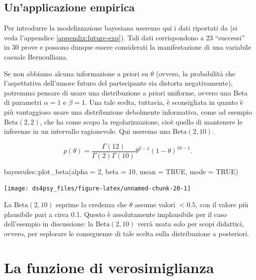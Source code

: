 \documentclass[
  11pt,
]{krantz}
\makeatletter
\newenvironment{Shaded}{\begin{snugshade}}{\end{snugshade}}
\newcommand{\AttributeTok}[1]{\textcolor[rgb]{0.61,0.61,0.61}{#1}}
\newcommand{\ConstantTok}[1]{\textcolor[rgb]{0,0,0}{#1}}
\newcommand{\DecValTok}[1]{\textcolor[rgb]{0.06,0.06,0.06}{#1}}
\newcommand{\FunctionTok}[1]{\textcolor[rgb]{0,0,0}{#1}}
\newcommand{\NormalTok}[1]{#1}
\newcommand{\SpecialCharTok}[1]{\textcolor[rgb]{0,0,0}{#1}}
\newenvironment{kframe}{%
\medskip{}
\setlength{\fboxsep}{.8em}
 \def\at@end@of@kframe{}%
 \ifinner\ifhmode%
  \def\at@end@of@kframe{\end{minipage}}%
  \begin{minipage}{\columnwidth}%
 \fi\fi%
 \def\FrameCommand##1{\hskip\@totalleftmargin \hskip-\fboxsep
 \colorbox{shadecolor}{##1}\hskip-\fboxsep
     \hskip-\linewidth \hskip-\@totalleftmargin \hskip\columnwidth}%
 \MakeFramed {\advance\hsize-\width
   \@totalleftmargin\z@ \linewidth\hsize
   \@setminipage}}%
 {\par\unskip\endMakeFramed%
 \at@end@of@kframe}
\renewenvironment{Shaded}{\begin{kframe}}{\end{kframe}}
\theoremstyle{definition}
\theoremstyle{definition}
\theoremstyle{definition}
\theoremstyle{definition}
\theoremstyle{remark}
\makeatother
\begin{document}
\hypertarget{unapplicazione-empirica}{%
\subsection{Un'applicazione empirica}\label{unapplicazione-empirica}}

Per introdurre la modelizzazione bayesiana useremo qui i dati riportati da \citet{zetschefuture2019} (si veda l'appendice \ref{appendix:future-exp}). Tali dati corrispondono a 23 ``successi'' in 30 prove e possono dunque essere considerati la manifestazione di una variabile casuale Bernoulliana.

Se non abbiamo alcuna informazione a priori su \(\theta\) (ovvero, la probabilità che l'aspettativa dell'umore futuro del partecipante sia distorta negativamente), potremmo pensare di usare una distribuzione a priori uniforme, ovvero una Beta di parametri \(\alpha=1\) e \(\beta=1\). Una tale scelta, tuttavia, è sconsigliata in quanto è più vantaggioso usare una distribuzione debolmente informativa, come ad esempio \(\mbox{Beta}(2, 2)\), che ha come scopo la regolarizzazione, cioè quello di mantenere le inferenze in un intervallo ragionevole. Qui useremo una \(\mbox{Beta}(2, 10)\).

\[
p(\theta) = \frac{\Gamma(12)}{\Gamma(2)\Gamma(10)}\theta^{2-1} (1-\theta)^{10-1}.
\]

\begin{Shaded}
\begin{Highlighting}[]
\NormalTok{bayesrules}\SpecialCharTok{::}\FunctionTok{plot\_beta}\NormalTok{(}\AttributeTok{alpha =} \DecValTok{2}\NormalTok{, }\AttributeTok{beta =} \DecValTok{10}\NormalTok{, }\AttributeTok{mean =} \ConstantTok{TRUE}\NormalTok{, }\AttributeTok{mode =} \ConstantTok{TRUE}\NormalTok{)}
\end{Highlighting}
\end{Shaded}

\begin{center}\texttt{[image: ds4psy\_files/figure-latex/unnamed-chunk-20-1]} \end{center}

La \(\mbox{Beta}(2, 10)\) esprime la credenza che \(\theta\) assume valori \(< 0.5\), con il valore più plausibile pari a circa 0.1. Questo è assolutamente implausibile per il caso dell'esempio in discussione: la \(\mbox{Beta}(2, 10)\) verrà usata solo per scopi didattici, ovvero, per esplorare le conseguenze di tale scelta sulla distribuzione a posteriori.

\hypertarget{la-funzione-di-verosimiglianza}{%
\section{La funzione di verosimiglianza}\label{la-funzione-di-verosimiglianza}}
\end{document}
